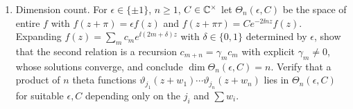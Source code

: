 \begin{exercise}
\begin{enumerate}[label=(\alph*)]
counted with multiplicity.  Deduce that $\vartheta_1$ vanishes exactly on
the lattice, with simple zeros, and that the zeros of
$\vartheta_2,\vartheta_3,\vartheta_4$ are the translates of the lattice by
$\frac\pi2$, $\frac\pi2+\frac{\pi\tau}2$, $\frac{\pi\tau}2$ respectively.
\item Dimension count.  For $\epsilon\in\{\pm1\}$, $n\ge1$, $C\in\mathbb C^\times$
let $\Theta_n(\epsilon,C)$ be the space of entire $f$ with
$f(z+\pi)=\epsilon f(z)$ and $f(z+\pi\tau)=Ce^{-2\ii nz}f(z)$.  Expanding
$f(z)=\sum_mc_me^{\ii(2m+\delta)z}$ with $\delta\in\{0,1\}$ determined by
$\epsilon$, show that the second relation is a recursion $c_{m+n}=\gamma_mc_m$
with explicit $\gamma_m\ne0$, whose solutions converge, and conclude
$\dim\Theta_n(\epsilon,C)=n$.  Verify that a product of $n$ theta
functions $\vartheta_{j_1}(z+w_1)\cdots\vartheta_{j_n}(z+w_n)$ lies in
$\Theta_n(\epsilon,C)$ for suitable $\epsilon,C$ depending only on the
$j_i$ and $\sum w_i$.
\end{enumerate}
\end{exercise}

